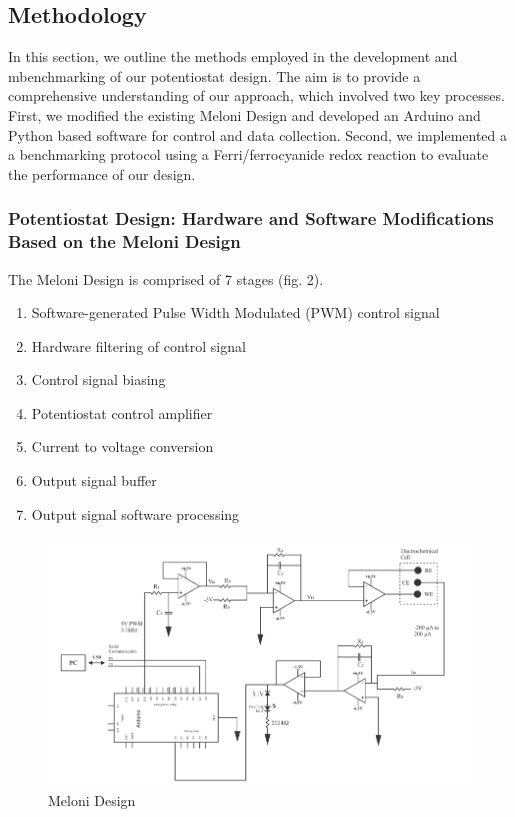 \documentclass{article}
\begin{document}
\subsection*{Methodology}

In this section, we outline the methods employed in the development and mbenchmarking of our potentiostat design. The aim is to provide a comprehensive understanding of our approach, which involved two key processes. First, we modified the existing Meloni Design and developed an Arduino and Python based software for control and data collection. Second, we implemented a a benchmarking protocol using a Ferri/ferrocyanide redox reaction to evaluate the performance of our design. 

\subsubsection*{Potentiostat Design: Hardware and Software Modifications Based on the Meloni Design}

The Meloni Design is comprised of 7 stages (fig. 2).
\begin{enumerate}
    \item Software-generated Pulse Width Modulated (PWM) control signal
    \item Hardware filtering of control signal
    \item Control signal biasing
    \item Potentiostat control amplifier
    \item Current to voltage conversion
    \item Output signal buffer
    \item Output signal software processing
\end{enumerate}

\begin{figure}[H]
    \centering
    \includegraphics[width=.7\linewidth]{meloni_design.png}
    \caption{Meloni Design}
\end{figure}
\end{document}
